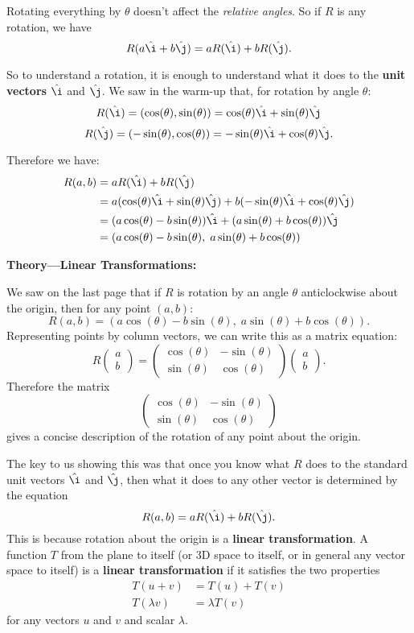 \documentclass{article}
\newcommand{\ihat}{\hat\i}
\newcommand{\jhat}{\hat\j}
\begin{document}
Rotating everything by $\theta$ doesn't affect the \textit{relative angles}. So if $R$ is any rotation, we have
\[R(a\ihat+b\jhat)=aR(\ihat)+bR(\jhat).\]

So to understand a rotation, it is enough to understand what it does to the \textbf{unit vectors} $\ihat$ and $\jhat$. We saw in the warm-up that, for rotation by angle $\theta$:
\[R(\ihat) = (\cos(\theta),\sin(\theta))=\cos(\theta)\ihat+\sin(\theta)\jhat\]
\[R(\jhat)=(-\sin(\theta),\cos(\theta))=-\sin(\theta)\ihat+\cos(\theta)\jhat.\]

Therefore we have:
\begin{align*}
R(a,b) &=aR(\ihat)+bR(\jhat)\\
&= a(\cos(\theta)\ihat+\sin(\theta)\jhat)+b(-\sin(\theta)\ihat+\cos(\theta)\jhat)\\
&= (a\cos(\theta)-b\sin(\theta))\ihat+(a\sin(\theta)+b\cos(\theta))\jhat\\
&=\left(a\cos(\theta)-b\sin(\theta),\; a\sin(\theta)+b\cos(\theta)\right)
\end{align*}

\clearpage


\textbf{Theory---Linear Transformations:}\bigskip


We saw on the last page that if $R$ is rotation by an angle $\theta$ anticlockwise about the origin, then for any point $(a,b)$:
\[R(a,b)=\left(a\cos(\theta)-b\sin(\theta),\; a\sin(\theta)+b\cos(\theta)\right).\]
Representing points by column vectors, we can write this as a matrix equation:
\[R\left(\begin{array}{c} a\\b\end{array}\right) = \left(\begin{array}{cc}\cos(\theta)&-\sin(\theta)\\\sin(\theta)&\cos(\theta)\end{array}\right)\left(\begin{array}{c}a\\b\end{array}\right).\]
Therefore the matrix
\[\left(\begin{array}{cc}\cos(\theta)&-\sin(\theta)\\\sin(\theta)&\cos(\theta)\end{array}\right)\]
gives a concise description of the rotation of any point about the origin.\medskip


The key to us showing this was that once you know what $R$ does to the standard unit vectors $\ihat$ and $\jhat$, then what it does to any other vector is determined by the equation
\[R(a,b)=aR(\ihat)+bR(\jhat).\]
This is because rotation about the origin is a \textbf{linear transformation}. A function $T$ from the plane to itself (or 3D space to itself, or in general any vector space to itself) is a \textbf{linear transformation} if it satisfies the two properties
\begin{align*}
	T(u+v)&=T(u)+T(v)\\
	T(\lambda v)&=\lambda T(v)
\end{align*}
for any vectors $u$ and $v$ and scalar $\lambda$.
\end{document}
